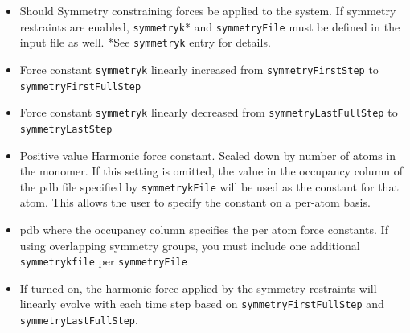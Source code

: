 \begin{itemize}
\item
{}
{Should Symmetry constraining forces be applied to the system.  If symmetry restraints are enabled,
{\tt symmetryk}* and {\tt symmetryFile} must be defined in the 
input file as well.  *See {\tt symmetryk} entry for details.}

\item
{}
{Force constant {\tt symmetryk} linearly increased from {\tt symmetryFirstStep} to {\tt symmetryFirstFullStep}}

\item
{}
{Force constant {\tt symmetryk} linearly decreased from {\tt symmetryLastFullStep} to {\tt symmetryLastStep}} 

\item
{}
{Positive value}
{Harmonic force constant.  Scaled down by number of atoms in the monomer.  If this setting is omitted, the value in the occupancy column
of the pdb file specified by {\tt symmetrykFile} will be used as the constant for that atom.  
This allows the user to specify the constant on a per-atom basis.}

\item
{}
{pdb where the occupancy column specifies the per atom force constants.  If using overlapping
symmetry groups, you must include one additional {\tt symmetrykfile} per {\tt symmetryFile} }

\item
{}
{If turned on, the harmonic force applied by the symmetry restraints will linearly evolve with each time step based on
{\tt symmetryFirstFullStep} and {\tt symmetryLastFullStep}.}


\end{itemize}
